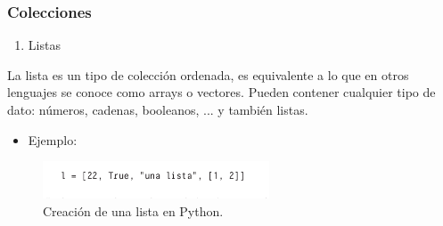 \begin{frame}[fragile]
  \frametitle{Colecciones}

  \begin{enumerate}[1.]
    \item Listas    
  \end{enumerate}


  La lista es un tipo de colecci\'on ordenada, es equivalente  a lo que en otros lenguajes se conoce como arrays o vectores. Pueden contener cualquier tipo de dato: n\'umeros, cadenas,
booleanos, ... y tambi\'en listas.

  \begin{itemize}
    \item Ejemplo:
  \end{itemize}

  \begin{figure}
    \includegraphics[width=0.6\textwidth]{Imagenes/Listas.jpg}
    \caption{\label{fig:Ejemplo1}Creaci\'on de una lista en Python.}
  \end{figure}  
 
 
\end{frame}

